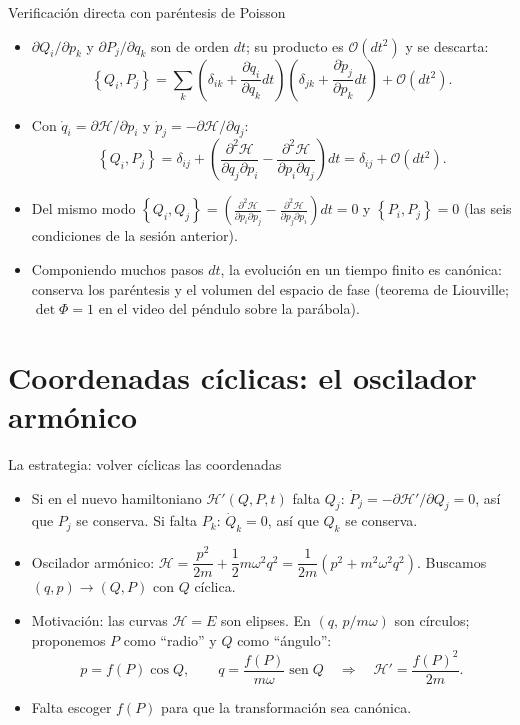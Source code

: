 \documentclass[spanish]{beamer}
\providecommand{\sen}{\operatorname{sen}}
\newcommand{\Ham}{\mathcal{H}}
\newcommand{\pd}[2]{\frac{\partial #1}{\partial #2}}
\newcommand{\pb}[2]{\left\{#1,#2\right\}}   %
\begin{document}
\begin{frame}{Verificación directa con paréntesis de Poisson}
\small
\begin{itemize}
  \item<1-> $\partial Q_i/\partial p_k$ y $\partial P_j/\partial q_k$ son de orden $dt$; su
        producto es $\mathcal O(dt^2)$ y se descarta:
  \[
    \pb{Q_i}{P_j} = \sum_{k}\left(\delta_{ik} + \pd{\dot q_i}{q_k}dt\right)
                    \left(\delta_{jk} + \pd{\dot p_j}{p_k}dt\right) + \mathcal O(dt^2) .
  \]
  \item<2-> Con $\dot q_i = \partial\Ham/\partial p_i$ y $\dot p_j = -\partial\Ham/\partial q_j$:
  \[
    \pb{Q_i}{P_j} = \delta_{ij} + \left( \frac{\partial^2\Ham}{\partial q_j\partial p_i}
                    - \frac{\partial^2\Ham}{\partial p_i\partial q_j} \right)dt
                  = \delta_{ij} + \mathcal O(dt^2) .
  \]
  \item<3-> Del mismo modo
        $\pb{Q_i}{Q_j} = \left(\frac{\partial^2\Ham}{\partial p_i\partial p_j}
        - \frac{\partial^2\Ham}{\partial p_j\partial p_i}\right)dt = 0$ y
        $\pb{P_i}{P_j} = 0$ (las seis condiciones de la sesión anterior).
  \item<4-> Componiendo muchos pasos $dt$, la evolución en un tiempo finito es
        canónica: conserva los paréntesis y el volumen del espacio de fase
        (teorema de Liouville; $\det\Phi = 1$ en el video del péndulo sobre la parábola).
\end{itemize}
\end{frame}

\section{Coordenadas cíclicas: el oscilador armónico}

\begin{frame}{La estrategia: volver cíclicas las coordenadas}
\begin{itemize}
  \item<1-> Si en el nuevo hamiltoniano $\Ham'(Q,P,t)$ falta $Q_j$:
        $\dot P_j = -\partial\Ham'/\partial Q_j = 0$, así que $P_j$ se conserva.
        Si falta $P_k$: $\dot Q_k = 0$, así que $Q_k$ se conserva.
  \item<2-> Oscilador armónico:
  \(
    \Ham = \dfrac{p^2}{2m} + \dfrac12 m\omega^2q^2 = \dfrac{1}{2m}\left(p^2 + m^2\omega^2q^2\right).
  \)
        Buscamos $(q,p)\to(Q,P)$ con $Q$ cíclica.
  \item<3-> Motivación: las curvas $\Ham = E$ son elipses. En $(q,\,p/m\omega)$ son
        círculos; proponemos $P$ como ``radio'' y $Q$ como ``ángulo'':
  \[
    p = f(P)\cos Q, \qquad q = \frac{f(P)}{m\omega}\sen Q
    \quad\Rightarrow\quad
    \Ham' = \frac{f(P)^2}{2m} .
  \]
  \item<4-> Falta escoger $f(P)$ para que la transformación sea canónica.
\end{itemize}
\end{frame}
\end{document}

